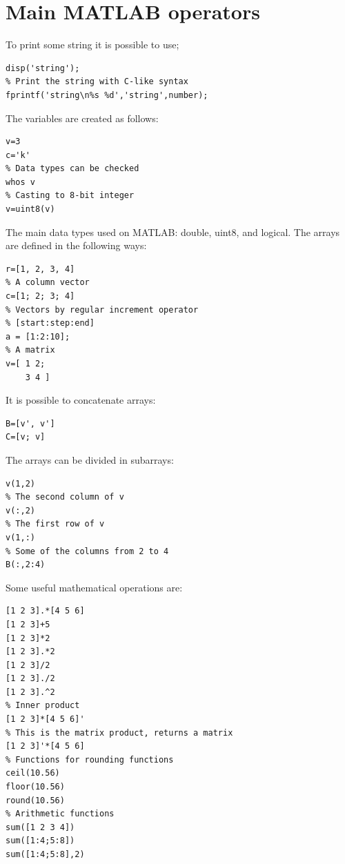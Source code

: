 \documentclass[12pt, a4paper]{report}
\newtheorem[style=M,bodystyle=\normalfont]{theorem}{Theorem}
\newtheorem[style=M,bodystyle=\normalfont]{corollary}{Corollary}
\newtheorem[style=M,bodystyle=\normalfont]{lemma}{Lemma}
\newtheorem[style=M,bodystyle=\normalfont]{definition}{Definition}
\begin{document}
    \section{Main MATLAB operators}
    To print some string it is possible to use; 
    \begin{lstlisting}[frame=single, numbers=none, style=Matlab-bw]
% Print the string
disp('string');
% Print the string with C-like syntax
fprintf('string\n%s %d','string',number);
    \end{lstlisting}
    The variables are created as follows: 
    \begin{lstlisting}[frame=single, numbers=none, style=Matlab-bw]
% Variables are created by assignements
v=3
c='k'
% Data types can be checked
whos v
% Casting to 8-bit integer
v=uint8(v)
    \end{lstlisting}
    The main data types used on MATLAB: double, uint8, and logical. The arrays are defined in the following ways: 
    \begin{lstlisting}[frame=single, numbers=none, style=Matlab-bw]
% A row vector
r=[1, 2, 3, 4]
% A column vector
c=[1; 2; 3; 4]
% Vectors by regular increment operator
% [start:step:end]
a = [1:2:10];
% A matrix
v=[ 1 2; 
    3 4 ]
    \end{lstlisting}
    It is possible to concatenate arrays: 
    \begin{lstlisting}[frame=single, numbers=none, style=Matlab-bw]
B=[v', v']
C=[v; v]        
    \end{lstlisting}
    The arrays can be divided in subarrays: 
    \begin{lstlisting}[frame=single, numbers=none, style=Matlab-bw]
% First row and second column 
v(1,2) 
% The second column of v
v(:,2)
% The first row of v
v(1,:) 
% Some of the columns from 2 to 4
B(:,2:4) 
    \end{lstlisting}
    Some useful mathematical operations are: 
    \begin{lstlisting}[frame=single, numbers=none, style=Matlab-bw]
% . means elementwise operation
[1 2 3].*[4 5 6]
[1 2 3]+5
[1 2 3]*2 
[1 2 3].*2 
[1 2 3]/2
[1 2 3]./2 
[1 2 3].^2 
% Inner product
[1 2 3]*[4 5 6]' 
% This is the matrix product, returns a matrix
[1 2 3]'*[4 5 6] 
% Functions for rounding functions
ceil(10.56)
floor(10.56)
round(10.56)
% Arithmetic functions
sum([1 2 3 4])
sum([1:4;5:8])
sum([1:4;5:8],2)
    \end{lstlisting}
\end{document}
